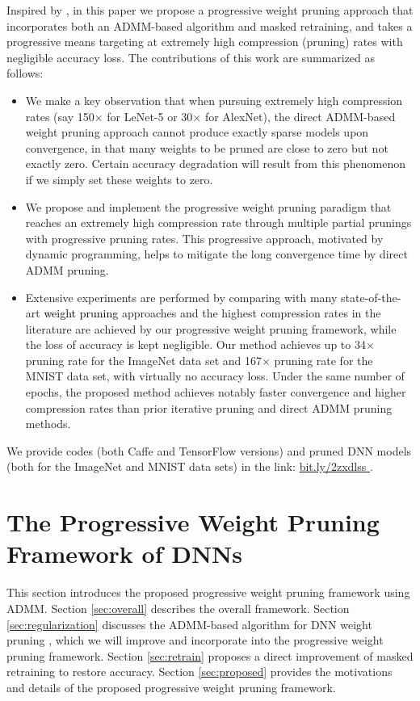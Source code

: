 \documentclass{article} %
\begin{document}
Inspired by \citet{zhang2018systematic}, in this paper we propose a progressive weight pruning approach that incorporates both an ADMM-based algorithm and masked retraining, and takes a progressive means targeting at extremely high compression (pruning) rates with negligible accuracy loss. The contributions of this work are summarized as follows:
\begin{itemize}
\item We make a key observation that when pursuing extremely high compression rates (say 150$\times$ for LeNet-5 or 30$\times$ for AlexNet), the direct ADMM-based weight pruning approach \citep{zhang2018systematic} cannot produce exactly sparse models upon convergence, in that many weights to be pruned are close to zero but not exactly zero. Certain accuracy degradation will result from this phenomenon if we simply set these weights to zero.
\item We propose and implement the progressive weight pruning paradigm that reaches an extremely high compression rate through multiple partial prunings with progressive pruning rates. This progressive approach, motivated by dynamic programming, helps to mitigate the long convergence time by direct ADMM pruning.
\item Extensive experiments are performed by comparing with many state-of-the-art \textcolor{black}{weight pruning} approaches and the highest compression rates in the literature are achieved by our progressive weight pruning framework, while the loss of accuracy is kept negligible. Our method achieves up to 34$\times$ pruning rate for the ImageNet data set and 167$\times$ pruning rate for the MNIST data set, with virtually no accuracy loss. Under the same number of epochs, the proposed method achieves notably faster convergence and higher compression rates than prior iterative pruning and direct ADMM pruning methods.
\end{itemize}

We provide codes (both Caffe and TensorFlow versions) and pruned DNN models (both for the ImageNet and MNIST data sets) in the link: \url{bit.ly/2zxdlss	}.


 


\section{The Progressive Weight Pruning Framework of DNNs}

This section introduces the proposed progressive weight pruning framework using ADMM. 
Section \ref{sec:overall} describes the overall framework. 
Section \ref{sec:regularization} discusses the ADMM-based algorithm for DNN weight pruning \citep{zhang2018systematic}, which we will improve and incorporate into the progressive weight pruning framework.
Section \ref{sec:retrain} proposes a direct improvement of masked retraining to restore accuracy.
Section \ref{sec:proposed} provides the motivations and details of the proposed progressive weight pruning framework.
\end{document}
